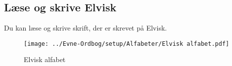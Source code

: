 \subsection*{Læse og skrive Elvisk}
Du kan læse og skrive skrift, der er skrevet på Elvisk.\\
\begin{figure}[H]
    \centering
    \texttt{[image: ../Evne-Ordbog/setup/Alfabeter/Elvisk alfabet.pdf]}
    \caption{Elvisk alfabet}
\end{figure}
